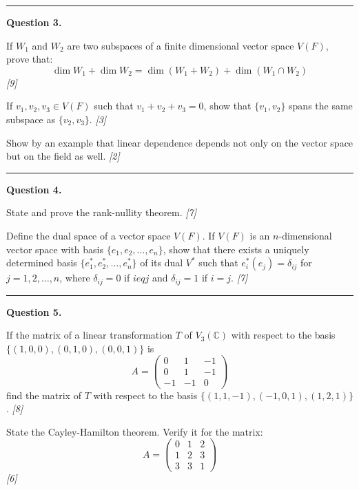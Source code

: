 \documentclass[11pt,a4paper]{article}
\newcommand{\pts}[1]{\hfill   \textit{[#1]}}
\begin{document}
\medskip\rule{\linewidth}{0.2pt}

\medskip


\noindent   \textbf{Question 3.}

\begin{parts}
  \item If $W_1$ and $W_2$ are two subspaces of a finite dimensional vector space $V(F)$, prove that:
  \[
  \dim W_1 + \dim W_2 = \dim(W_1 + W_2) + \dim(W_1 \cap W_2)
  \] \pts{9}
  \item
  
\begin{parts}
    \item If $v_1, v_2, v_3 \in V(F)$ such that $v_1 + v_2 + v_3 = 0$, show that $\{v_1, v_2\}$ spans the same subspace as $\{v_2, v_3\}$. \pts{3}
    \item Show by an example that linear dependence depends not only on the vector space but on the field as well. \pts{2}
  \end{parts}
\end{parts}

\medskip\rule{\linewidth}{0.2pt}

\medskip


\noindent   \textbf{Question 4.}

\begin{parts}
  \item State and prove the rank-nullity theorem. \pts{7}
  \item Define the dual space of a vector space $V(F)$. If $V(F)$ is an $n$-dimensional vector space with basis $\{e_1, e_2, \dots, e_n\}$, show that there exists a uniquely determined basis $\{e_1^*, e_2^*, \dots, e_n^*\}$ of its dual $V^*$ such that $e_i^*(e_j) = \delta_{ij}$ for $j = 1, 2, \dots, n$, where $\delta_{ij} = 0$ if $i 
eq j$ and $\delta_{ij} = 1$ if $i = j$. \pts{7}
\end{parts}

\medskip\rule{\linewidth}{0.2pt}

\medskip


\noindent   \textbf{Question 5.}

\begin{parts}
  \item If the matrix of a linear transformation $T$ of $V_3(\mathbb{C})$ with respect to the basis $\{(1,0,0),(0,1,0),(0,0,1)\}$ is
  \[
  A = 
\begin{pmatrix} 0 & 1 & -1 \\ 0 & 1 & -1 \\ -1 & -1 & 0 \end{pmatrix}
  \]
  find the matrix of $T$ with respect to the basis $\{(1,1,-1),(-1,0,1),(1,2,1)\}$. \pts{8}
  \item State the Cayley-Hamilton theorem. Verify it for the matrix:
  \[
  A = 
\begin{pmatrix} 0 & 1 & 2 \\ 1 & 2 & 3 \\ 3 & 3 & 1 \end{pmatrix}
  \] \pts{6}
\end{parts}
\end{document}
